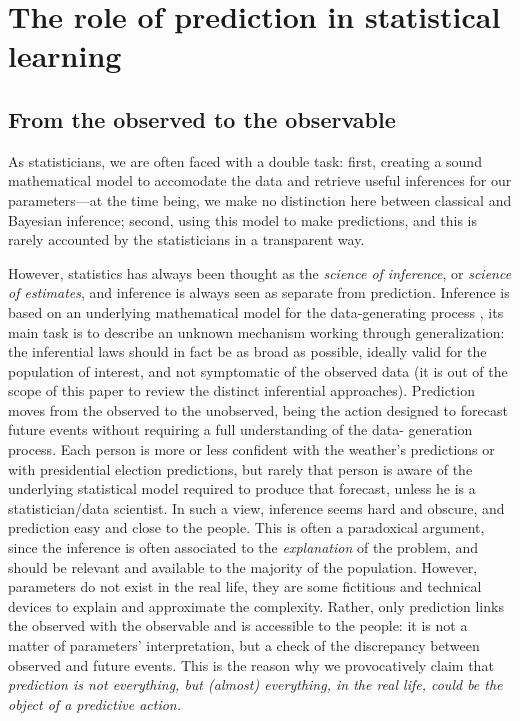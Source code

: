 \documentclass{statsoc}
\begin{document}
\section{The role of prediction in statistical learning}
\label{sec:role}

\subsection{From the observed to the observable}

As statisticians, we are often faced with a double task: first, creating a sound mathematical model to accomodate the data and retrieve useful inferences for our 
parameters---at the time being, we make no distinction here between classical and Bayesian inference; second, using this model to make predictions, and this is rarely accounted by the statisticians in a transparent way.

However, statistics has always been thought as the \emph{science of inference}, or \emph{science of estimates}, and inference is always seen as separate from prediction. Inference is based on 
an underlying mathematical model for the data-generating process \citep{bzdok2018points}, its main task is to describe an unknown mechanism working through generalization: the 
inferential laws should in fact be as broad as possible, ideally valid for the population of interest, and not symptomatic of the observed data (it is out of the scope of this paper to review the distinct inferential 
approaches). Prediction moves from the observed to the unobserved, being the action designed to forecast future events without requiring a full understanding of the data-
generation process. Each person is more or less confident with the weather's predictions or with presidential election predictions, but rarely that person is aware of the underlying 
statistical model required to produce that forecast, unless he is a statistician/data scientist. In such a view, inference seems hard and obscure, and prediction easy and close 
to the people. This is often a paradoxical argument, since the inference is often associated to the \emph{explanation} of the problem, and should be relevant and available to the majority of the population. However, parameters do not exist in the real life, they are some fictitious and technical devices to explain and approximate the complexity. Rather, only prediction links the observed with the observable and is accessible to the people: it is not a matter of parameters' interpretation, but a check of the discrepancy between observed and future events. This is the reason why we provocatively claim that \emph{prediction is not everything, but (almost) everything, in the real life, could be the object of a predictive action.}
\end{document}
